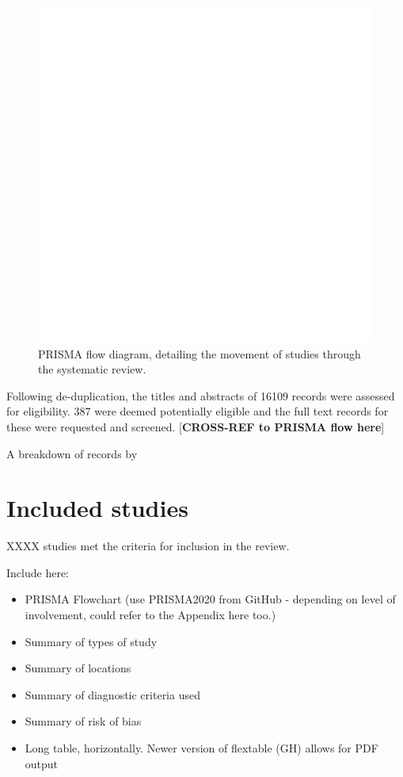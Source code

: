 \documentclass[a4paper, twoside]{templates/ociamthesis}
\begin{document}
\begin{figure}
\includegraphics[width=1\linewidth]{figures/sys-rev/prismaflow} \caption{PRISMA flow diagram, detailing the movement of studies through the systematic review.}\label{fig:prisma-flow}
\end{figure}

Following de-duplication, the titles and abstracts of 16109 records were assessed for eligibility. 387 were deemed potentially eligible and the full text records for these were requested and screened. {[}\textbf{CROSS-REF to PRISMA flow here}{]}

A breakdown of records by

\hypertarget{included-studies}{%
\section{Included studies}\label{included-studies}}

XXXX studies met the criteria for inclusion in the review.

Include here:

\begin{itemize}
\item
  PRISMA Flowchart (use PRISMA2020 from GitHub - depending on level of involvement, could refer to the Appendix here too.)
\item
  Summary of types of study
\item
  Summary of locations
\item
  Summary of diagnostic criteria used
\item
  Summary of risk of bias
\item
  Long table, horizontally. Newer version of flextable (GH) allows for PDF output
\end{itemize}
\end{document}
